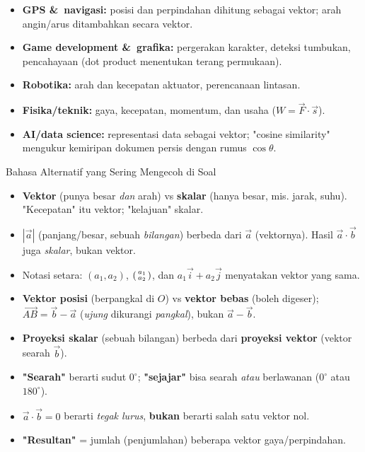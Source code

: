 \documentclass[11pt,a4paper]{report}
\theoremstyle{gaya}
\begin{document}
\begin{dunianyata}
\begin{itemize}[leftmargin=*,topsep=2pt]
  \item \textbf{GPS \&\ navigasi:} posisi dan perpindahan dihitung sebagai vektor; arah angin/arus ditambahkan secara vektor.
  \item \textbf{Game development \&\ grafika:} pergerakan karakter, deteksi tumbukan, pencahayaan (dot product menentukan terang permukaan).
  \item \textbf{Robotika:} arah dan kecepatan aktuator, perencanaan lintasan.
  \item \textbf{Fisika/teknik:} gaya, kecepatan, momentum, dan usaha ($W=\vec F\cdot\vec s$).
  \item \textbf{AI/data science:} representasi data sebagai vektor; "cosine similarity" mengukur kemiripan dokumen persis dengan rumus $\cos\theta$.
\end{itemize}
\end{dunianyata}

\begin{konsep}{Bahasa Alternatif yang Sering Mengecoh di Soal}
\begin{itemize}[leftmargin=*,topsep=2pt]
  \item \textbf{Vektor} (punya besar \emph{dan} arah) vs \textbf{skalar} (hanya besar, mis. jarak, suhu). "Kecepatan" itu vektor; "kelajuan" skalar.
  \item $|\vec a|$ (panjang/besar, sebuah \emph{bilangan}) berbeda dari $\vec a$ (vektornya). Hasil $\vec a\cdot\vec b$ juga \emph{skalar}, bukan vektor.
  \item Notasi setara: $(a_1,a_2)$, $\begin{psmallmatrix}a_1\\a_2\end{psmallmatrix}$, dan $a_1\vec i+a_2\vec j$ menyatakan vektor yang sama.
  \item \textbf{Vektor posisi} (berpangkal di $O$) vs \textbf{vektor bebas} (boleh digeser); $\vec{AB}=\vec b-\vec a$ (\emph{ujung} dikurangi \emph{pangkal}), bukan $\vec a-\vec b$.
  \item \textbf{Proyeksi skalar} (sebuah bilangan) berbeda dari \textbf{proyeksi vektor} (vektor searah $\vec b$).
  \item \textbf{"Searah"} berarti sudut $0^\circ$; \textbf{"sejajar"} bisa searah \emph{atau} berlawanan ($0^\circ$ atau $180^\circ$).
  \item $\vec a\cdot\vec b=0$ berarti \emph{tegak lurus}, \textbf{bukan} berarti salah satu vektor nol.
  \item \textbf{"Resultan"} = jumlah (penjumlahan) beberapa vektor gaya/perpindahan.
\end{itemize}
\end{konsep}
\end{document}
